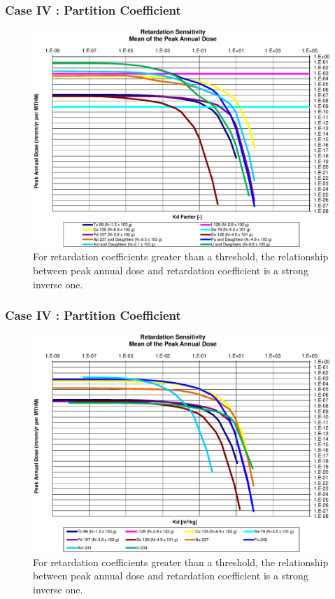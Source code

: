 \begin{frame}[c]
  \frametitle{Case IV : Partition Coefficient}

\begin{figure}[ht]
\centering
\includegraphics[width=\linewidth]{Sorption/Retardation_Summary_kdFactor.eps}
\caption{
For retardation coefficients greater than a threshold, the 
relationship between peak annual dose and retardation coefficient is a strong 
inverse one. }
\label{fig:KdSumFactor}
\end{figure}
\end{frame}

\begin{frame}[c]
  \frametitle{Case IV : Partition Coefficient}

\begin{figure}[ht]
\centering
\includegraphics[width=\linewidth]{Sorption/Retardation_Summary_kd.eps}
\caption{
For retardation coefficients greater than a threshold, the 
relationship between peak annual dose and retardation coefficient is a strong 
inverse one. }
\label{fig:KdSum}
\end{figure}
\end{frame}


